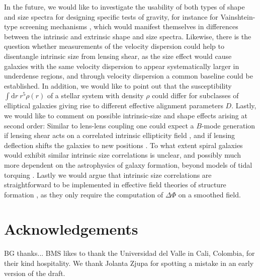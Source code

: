 \documentclass[a4paper,fleqn,usenatbib]{mnras}
\newcommand{\dd}{\mathrm{d}}
\begin{document}
In the future, we would like to investigate the usability of both types of shape and size spectra for designing specific tests of gravity, for instance for Vainshtein-type screening mechanisms \citep{kirk_optimising_2011, tessore_weak_2015}, which would manifest themselves in differences between the intrinsic and extrinsic shape and size spectra. Likewise, there is the question whether measurements of the velocity dispersion could help to disentangle intrinsic size from lensing shear, as the size effect would cause galaxies with the same velocity dispersion to appear systematically larger in underdense regions, and through velocity dispersion a common baseline could be established. In addition, we would like to point out that the susceptibility $\int\dd r\:r^5\rho(r)$ of a stellar system with density $\rho$ could differ for subclasses of elliptical galaxies giving rise to different effective alignment parameters $D$. Lastly, we would like to comment on possible intrinsic-size and shape effects arising at second order: Similar to lens-lens coupling one could expect a $B$-mode generation if lensing shear acts on a correlated intrinsic ellipticity field \citep[similar to][]{cooray_second-order_2002}, and if lensing deflection shifts the galaxies to new positions \citep{giahi_evolution_2013, giahi-saravani_weak_2014}. To what extent spiral galaxies would exhibit similar intrinsic size correlations is unclear, and possibly much more dependent on the astrophysics of galaxy formation, beyond models of tidal torquing \citep{schaefer_review:_2009}. Lastly we would argue that intrinsic size correlations are straightforward to be implemented in effective field theories of structure formation \citep{fang_fast-pt_2017, vlah_eft_2019}, as they only require the computation of $\Delta\Phi$ on a smoothed field.


\section*{Acknowledgements}
BG thanks...   BMS likes to thank the Universidad del Valle in Cali, Colombia, for their kind hospitality. We thank Jolanta Zjupa for spotting a mistake in an early version of the draft.






\bsp
\label{lastpage}
\end{document}
